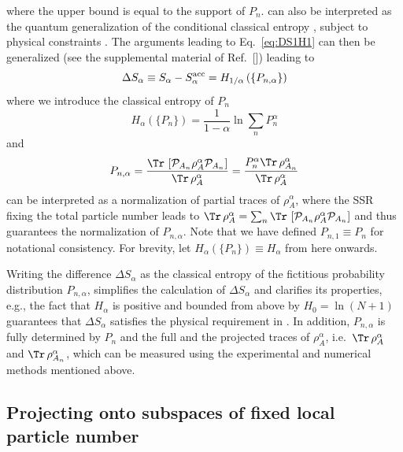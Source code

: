 %
where the upper bound is equal to the support of $P_n$.  can also be interpreted as the quantum generalization of the conditional classical \ren entropy \cite{Cachin97entropymeasures,GolshaniPashaYari:2009,Hayashi:2011,SKORIC:2011el,FehrBerens2014}, subject to physical constraints \cite{Barghathi:2018oe}. The arguments leading to Eq.~\eqref{eq:DS1H1} can then be generalized (see the supplemental material of Ref.~[\cite{Barghathi:2018oe}]) leading to 
%
\begin{equation}
    \Delta S_{\alpha}\equiv  S_{\alpha} - S_{\alpha}^{{\rm acc}} = H_{{1}/{\alpha}}\left(\{P_{n,\alpha}\}\right)
\label{eq:S_alpha_acc5}
\end{equation}
%
where we introduce the classical \ren entropy of $P_n$
%
\begin{equation}
    H_{\alpha}\left(\{P_n\}\right)=\frac{1}{1-\alpha}\ln\sum_n P_n^{\alpha} 
\label{eq:Halpha}
\end{equation}
%
and
%
\begin{equation}
    P_{n,\alpha}=\frac{\Tr\, \left[{\mathcal{P}}_{A_{n}} \rho_A^{\alpha} {\mathcal{P}}_{A_{n}}\right]}{\Tr\, \rho_A^{\alpha}}=\frac{ P_n^\alpha\Tr\, \rho_{A_n}^{\alpha}}{\Tr\, \rho_A^{\alpha}}
\label{eq:Pna}
\end{equation}
%
can be interpreted as a normalization of partial traces of $\rho_A^{\alpha}$, where the SSR fixing the total particle number leads to $\Tr\, \rho_A^{\alpha}=\sum_n \Tr\, \left[{\mathcal{P}}_{A_{n}} \rho_A^{\alpha} {\mathcal{P}}_{A_{n}}\right]$ and thus guarantees the normalization of $P_{n,\alpha}$. Note that we have defined $P_{n,1} \equiv P_n$ for notational consistency. For brevity, let $H_{\alpha}(\{P_n\}) \equiv H_{\alpha}$ from here onwards. 

Writing the difference $\Delta S_{\alpha}$ as the classical \ren entropy of the fictitious probability distribution $P_{n,\alpha}$, simplifies the calculation of $\Delta S_{\alpha}$ and clarifies its properties, e.g., the fact that $H_{\alpha}$  is positive and bounded from above by $ H_{0}=\ln(N+1)$ guarantees that $\Delta S_{\alpha}$ satisfies the physical requirement in . \cite{Barghathi:2018oe} In addition, $P_{n,\alpha}$ is fully determined by $P_n$ and the full and the projected traces of $\rho_A^{\alpha}$, i.e.~$\Tr\, \rho_{A}^{\alpha}$ and $\Tr\, \rho_{A_n}^{\alpha}$, which can be measured using the experimental and numerical methods mentioned above.   

\subsection{Projecting onto subspaces of fixed local particle number}
	
